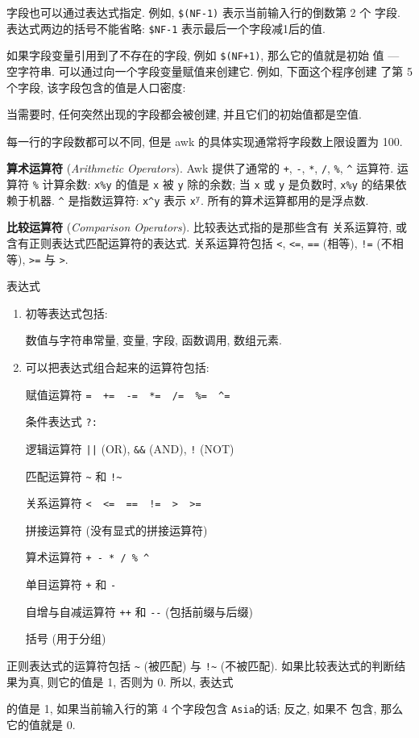 字段也可以通过表达式指定. 例如, \verb'$(NF-1)' 表示当前输入行的倒数第 2 个
字段. 表达式两边的括号不能省略: \verb'$NF-1' 表示最后一个字段减1后的值.

如果字段变量引用到了不存在的字段, 例如 \verb'$(NF+1)', 那么它的值就是初始
值 --- 空字符串. 可以通过向一个字段变量赋值来创建它. 例如, 下面这个程序创建
了第 5 个字段, 该字段包含的值是人口密度:
当需要时, 任何突然出现的字段都会被创建, 并且它们的初始值都是空值.

每一行的字段数都可以不同, 但是 awk 的具体实现通常将字段数上限设置为 100.

\textbf{算术运算符} (\emph{Arithmetic Operators}). Awk 提供了通常的 \verb'+',
\verb'-', \verb'*', \verb'/', \verb'%', \verb'^' 运算符. 运算符 \verb'%'
计算余数: \verb'x%y' 的值是 \verb'x' 被 \verb'y' 除的余数; 当 \verb'x' 或
\verb'y' 是负数时, \verb'x%y' 的结果依赖于机器. \verb'^' 是指数运算符:
\verb'x^y' 表示 \verb'x'$^\texttt{y}$. 所有的算术运算都用的是浮点数.

\textbf{比较运算符} (\emph{Comparison Operators}). 比较表达式指的是那些含有
关系运算符, 或含有正则表达式匹配运算符的表达式. 关系运算符包括 \verb'<',
\verb'<=', \verb'==' (相等), \verb'!=' (不相等), \verb'>=' 与 \verb'>'.
\begin{summary}{表达式}
    \begin{enumerate}
        \item 初等表达式包括: \par
            数值与字符串常量, 变量, 字段, 函数调用, 数组元素.
        \item 可以把表达式组合起来的运算符包括: \par
            赋值运算符 \verb'=  +=  -=  *=  /=  %=  ^='
        \par 条件表达式 \verb'?:'
        \par 逻辑运算符 \verb'||' (OR), \verb'&&' (AND), \verb'!' (NOT)
        \par 匹配运算符 \verb'~' 和 \verb'!~'
        \par 关系运算符 \verb'<  <=  ==  !=  >  >=' 
        \par 拼接运算符 (没有显式的拼接运算符)
        \par 算术运算符 \verb'+ - * / % ^'
        \par 单目运算符 \verb'+' 和 \verb'-'
        \par 自增与自减运算符 \verb'++' 和 \verb'--' (包括前缀与后缀)
        \par 括号 (用于分组)
    \end{enumerate}
\end{summary}
正则表达式的运算符包括 \verb'~' (被匹配) 与 \verb'!~' (不被匹配).
如果比较表达式的判断结果为真, 则它的值是 1, 否则为 0. 所以, 表达式
的值是 1, 如果当前输入行的第 4 个字段包含 \verb'Asia'的话; 反之, 如果不
包含, 那么它的值就是 0.

